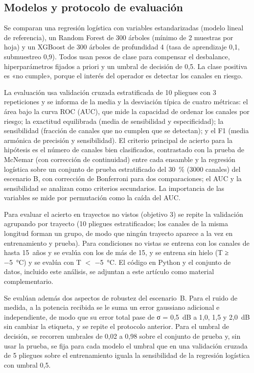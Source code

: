 \documentclass[runningheads]{llncs}
\begin{document}
\subsection{Modelos y protocolo de evaluación}

Se comparan una regresión logística con variables estandarizadas (modelo lineal de referencia), un Random Forest de 300 árboles (mínimo de 2 muestras por hoja) y un XGBoost de 300 árboles de profundidad 4 (tasa de aprendizaje 0,1, submuestreo 0,9). Todos usan pesos de clase para compensar el desbalance, hiperparámetros fijados a priori y un umbral de decisión de 0,5. La clase positiva es «no cumple», porque el interés del operador es detectar los canales en riesgo.

La evaluación usa validación cruzada estratificada de 10 pliegues con 3 repeticiones y se informa de la media y la desviación típica de cuatro métricas: el área bajo la curva ROC (AUC), que mide la capacidad de ordenar los canales por riesgo; la exactitud equilibrada (media de sensibilidad y especificidad); la sensibilidad (fracción de canales que no cumplen que se detectan); y el F1 (media armónica de precisión y sensibilidad). El criterio principal de acierto para la hipótesis es el número de canales bien clasificados, contrastado con la prueba de McNemar (con corrección de continuidad) entre cada ensamble y la regresión logística sobre un conjunto de prueba estratificado del 30~\% (3000 canales) del escenario B, con corrección de Bonferroni para dos comparaciones; el AUC y la sensibilidad se analizan como criterios secundarios. La importancia de las variables se mide por permutación como la caída del AUC.

Para evaluar el acierto en trayectos no vistos (objetivo 3) se repite la validación agrupando por trayecto (10 pliegues estratificados; los canales de la misma longitud forman un grupo, de modo que ningún trayecto aparece a la vez en entrenamiento y prueba). Para condiciones no vistas se entrena con los canales de hasta 15~años y se evalúa con los de más de 15, y se entrena sin hielo (T ≥ −5~°C) y se evalúa con T $<$ −5~°C. El código en Python y el conjunto de datos, incluido este análisis, se adjuntan a este artículo como material complementario.

Se evalúan además dos aspectos de robustez del escenario~B. Para el ruido de medida, a la potencia recibida se le suma un error gaussiano adicional e independiente, de modo que su error total pase de σ = 0,5~dB a 1,0, 1,5 y 2,0~dB sin cambiar la etiqueta, y se repite el protocolo anterior. Para el umbral de decisión, se recorren umbrales de 0,02 a 0,98 sobre el conjunto de prueba y, sin usar la prueba, se fija para cada modelo el umbral que en una validación cruzada de 5 pliegues sobre el entrenamiento iguala la sensibilidad de la regresión logística con umbral 0,5.
\end{document}
